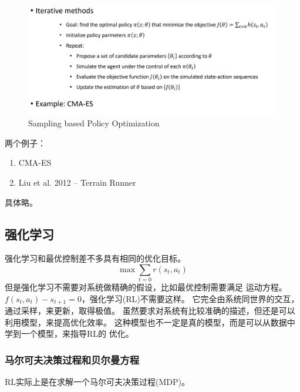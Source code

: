 \documentclass[lang=cn,newtx,10pt,scheme=chinese]{elegantbook}
\begin{document}
\begin{figure}[htbp]
  \centering
  \includegraphics[totalheight=1.6in]{"./image/SamplingbasedPolicyOptimization.png"}
  \caption{Sampling based Policy Optimization} \label{fig:SamplingbasedPO}
\end{figure}

两个例子：
\begin{enumerate}
  \setlength{\itemindent}{2em}
  \item CMA-ES
  \item Liu et al. 2012 – Terrain Runner
\end{enumerate}

具体略。

\subsection{强化学习}
强化学习和最优控制差不多具有相同的优化目标。
\begin{equation}
  \max \sum_{t=0} r\left(s_t, a_t\right)
\end{equation}
但是强化学习不需要对系统做精确的假设，比如最优控制需要满足
运动方程。$f(s_t, a_t) - s_{t+1}=0$，强化学习(RL)不需要这样。
它完全由系统同世界的交互，通过采样，来更新，取得极值。
虽然要求对系统有比较准确的描述，但还是可以利用模型，来提高优化效率。
这种模型也不一定是真的模型，而是可以从数据中学到一个模型，来指导RL的
优化。

\subsubsection{马尔可夫决策过程和贝尔曼方程}
RL实际上是在求解一个马尔可夫决策过程(MDP)。
\end{document}
